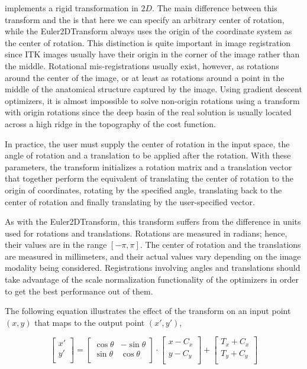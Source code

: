  implements a rigid transformation in $2D$.
The main difference between this transform and the 
is that here we can specify an arbitrary center of rotation, while the
Euler2DTransform always uses the origin of the coordinate system as the center
of rotation. This distinction is quite important in image registration since
ITK images usually have their origin in the corner of the image rather than the
middle.  Rotational mis-registrations usually exist, however, as rotations
around the center of the image, or at least as rotations around a point in the
middle of the anatomical structure captured by the image. Using gradient
descent optimizers, it is almost impossible to solve non-origin rotations using
a transform with origin rotations since the deep basin of the real solution is
usually located across a high ridge in the topography of the cost function.

In practice, the user must supply the center of rotation in the input space,
the angle of rotation and a translation to be applied after the rotation. With
these parameters, the transform initializes a rotation matrix and a translation
vector that together perform the equivalent of translating the center of
rotation to the origin of coordinates, rotating by the specified angle,
translating back to the center of rotation and finally translating by the
user-specified vector.

As with the Euler2DTransform, this transform suffers from the difference in
units used for rotations and translations. Rotations are measured in radians;
hence, their values are in the range $[-\pi,\pi]$. The center of rotation and
the translations are measured in millimeters, and their actual values vary
depending on the image modality being considered.  Registrations involving
angles and translations should take advantage of the scale normalization
functionality of the optimizers in order to get the best performance out of
them.

The following equation illustrates the effect of the transform on an input
point $(x,y)$ that maps to the output point $(x',y')$,

\begin{equation}
\left[
\begin{array}{c}
x' \\
y' \\
\end{array}
\right]
=
\left[
\begin{array}{cc}
\cos{\theta} & -\sin{\theta} \\
\sin{\theta} &  \cos{\theta} \\
\end{array}
\right]
\cdot
\left[
\begin{array}{c}
x - C_x \\
y - C_y \\
\end{array}
\right]
+
\left[
\begin{array}{c}
T_x + C_x \\
T_y + C_y \\
\end{array}
\right]
\end{equation}

